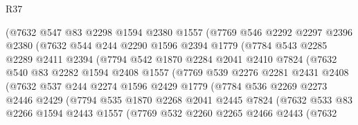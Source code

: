 \begin{lexlean}{R37}
\begin{coremodule}
              (@7632
                @547
                @83
                @2298
                @1594
                @2380
                @1557
                (@7769
                  @546
                  @2292
                  @2297
                  @2396
                  @2380
                  (@7632
                    @544
                    @244
                    @2290
                    @1596
                    @2394
                    @1779
                    (@7784
                      @543
                      @2285
                      @2289
                      @2411
                      @2394
                      (@7794
                        @542
                        @1870
                        @2284
                        @2041
                        @2410
                        @7824
                        (@7632
                          @540
                          @83
                          @2282
                          @1594
                          @2408
                          @1557
                          (@7769
                            @539
                            @2276
                            @2281
                            @2431
                            @2408
                            (@7632
                              @537
                              @244
                              @2274
                              @1596
                              @2429
                              @1779
                              (@7784
                                @536
                                @2269
                                @2273
                                @2446
                                @2429
                                (@7794
                                  @535
                                  @1870
                                  @2268
                                  @2041
                                  @2445
                                  @7824
                                  (@7632
                                    @533
                                    @83
                                    @2266
                                    @1594
                                    @2443
                                    @1557
                                    (@7769
                                      @532
                                      @2260
                                      @2265
                                      @2466
                                      @2443
                                      (@7632

\end{coremodule}
\end{lexlean}
